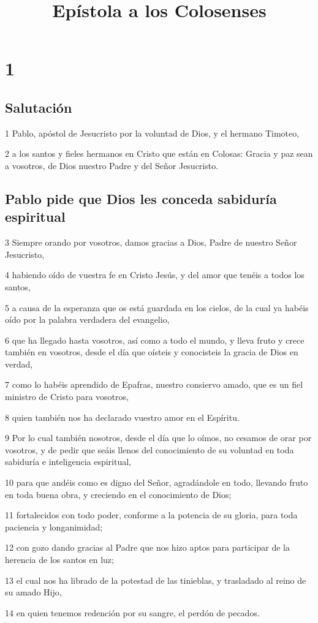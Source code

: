 
\title{Epístola a los Colosenses}

\chapter{1}

\section*{Salutación}

\par 1 Pablo, apóstol de Jesucristo por la voluntad de Dios, y el hermano Timoteo,
\par 2 a los santos y fieles hermanos en Cristo que están en Colosas: Gracia y paz sean a vosotros, de Dios nuestro Padre y del Señor Jesucristo.

\section*{Pablo pide que Dios les conceda sabiduría espiritual}

\par 3 Siempre orando por vosotros, damos gracias a Dios, Padre de nuestro Señor Jesucristo,
\par 4 habiendo oído de vuestra fe en Cristo Jesús, y del amor que tenéis a todos los santos,
\par 5 a causa de la esperanza que os está guardada en los cielos, de la cual ya habéis oído por la palabra verdadera del evangelio,
\par 6 que ha llegado hasta vosotros, así como a todo el mundo, y lleva fruto y crece también en vosotros, desde el día que oísteis y conocisteis la gracia de Dios en verdad,
\par 7 como lo habéis aprendido de Epafras, nuestro consiervo amado, que es un fiel ministro de Cristo para vosotros,
\par 8 quien también nos ha declarado vuestro amor en el Espíritu.
\par 9 Por lo cual también nosotros, desde el día que lo oímos, no cesamos de orar por vosotros, y de pedir que seáis llenos del conocimiento de su voluntad en toda sabiduría e inteligencia espiritual,
\par 10 para que andéis como es digno del Señor, agradándole en todo, llevando fruto en toda buena obra, y creciendo en el conocimiento de Dios;
\par 11 fortalecidos con todo poder, conforme a la potencia de su gloria, para toda paciencia y longanimidad;
\par 12 con gozo dando gracias al Padre que nos hizo aptos para participar de la herencia de los santos en luz;
\par 13 el cual nos ha librado de la potestad de las tinieblas, y trasladado al reino de su amado Hijo,
\par 14 en quien tenemos redención por su sangre, el perdón de pecados.

